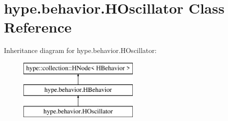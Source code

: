 \hypertarget{classhype_1_1behavior_1_1_h_oscillator}{\section{hype.\-behavior.\-H\-Oscillator Class Reference}
\label{classhype_1_1behavior_1_1_h_oscillator}
}
Inheritance diagram for hype.\-behavior.\-H\-Oscillator\-:\begin{figure}[H]
\begin{center}
\leavevmode
\includegraphics[height=3.000000cm]{classhype_1_1behavior_1_1_h_oscillator}
\end{center}
\end{figure}
